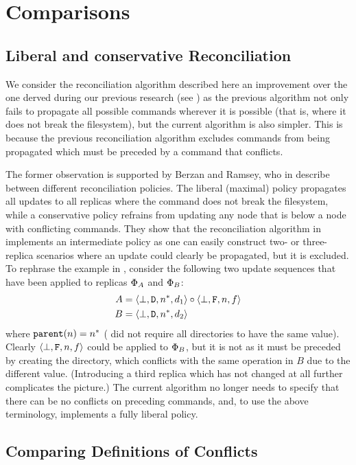 
\section{Comparisons}

\subsection{Liberal and conservative Reconciliation}

We consider the reconciliation algorithm described here an improvement over
the one derved during our previous research (see \cite{NREC})
as the previous algorithm not only fails to propagate all possible commands
wherever it is possible (that is, where it does not break the filesystem),
but the current algorithm is also simpler.
This is because the previous reconciliation algorithm excludes
commands from being propagated which must be preceded by a command that conflicts.

The former observation is supported by Berzan and Ramsey, who in \cite{CBNR} 
describe between different reconciliation policies.
The liberal (maximal) policy propagates all updates to all replicas where
the command does not break the filesystem, while a conservative policy
refrains from updating any node that is below a node with conflicting commands.
They show that the reconciliation algorithm in \cite{NREC} implements
an intermediate policy as one can easily construct two- or three-replica scenarios
where an update could clearly be propagated, but it is excluded.
To rephrase the example in \cite{CBNR}, consider the following two
update sequences that have been applied to replicas $\Phi_A$ and $\Phi_B$:
\begin{align*}
A&=\langle{\bot,\mathtt{D},n^*,d_1}\rangle\circ\langle{\bot,\mathtt{F},n,f}\rangle \\
B&=\langle{\bot,\mathtt{D},n^*,d_2}\rangle
\end{align*}
where $\mathtt{parent}(n)=n^*$ (\cite{NREC} did not require all directories to have the same value).
Clearly $\langle{\bot,\mathtt{F},n,f}\rangle$ could be applied to $\Phi_B$, but it is not as
it must be preceded by creating the directory, which conflicts with the same operation in $B$
due to the different value.
(Introducing a third replica which has not changed at all further complicates the picture.)
The current algorithm no longer needs to specify that there can be no conflicts
on preceding commands, and, to use the above terminology, implements a fully liberal policy.


\subsection{Comparing Definitions of Conflicts}

